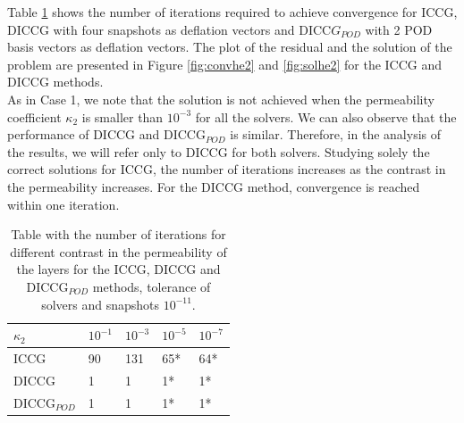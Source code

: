 \documentclass{ecmorXV}
\begin{document}
Table \ref{table:he2} shows the number of iterations required to achieve convergence 
for ICCG, DICCG with four snapshots as deflation vectors and DICC$G_{POD}$ with 2 POD basis vectors
as deflation vectors. The plot of the residual and the solution of the problem are presented in 
Figure \ref{fig:convhe2} and \ref{fig:solhe2} for the ICCG and DICCG methods.\\
As in Case 1, we note that the solution is not achieved when the permeability coefficient $\kappa_2$
is smaller than $10^{-3}$ for all the solvers. We can also observe that the performance of DICCG
and DICCG$_{POD}$ is similar. Therefore, in the analysis of the results, we will refer only to DICCG for
both solvers.
Studying solely the correct solutions for ICCG, the number of iterations 
increases as the contrast in the permeability increases. For the DICCG method, convergence is reached 
within one iteration.\\
\begin{table}[!ht]
\centering
\begin{tabular}{ |p{2.5cm}|p{1.5cm}|p{1.5cm}|p{1.5cm}| p{1.5cm}|} 
\hline
$\kappa_2$& $10^{-1}$ &$10^{-3}$  & $10^{-5}$ &$10^{-7}$\\
 \hline
  ICCG  & 90& 131&65*&64*\\ 
  DICCG  & 1 &1& 1*&1*\\ 
  DICCG$_{POD}$ & 1& 1& 1*& 1*\\
 \hline
\end{tabular}
\caption{Table with the number of iterations for different contrast in the permeability of the layers
for the ICCG, DICCG and DICCG$_{POD}$ methods, tolerance of solvers and snapshots $10^{-11}$. }
\label{table:he2}
\end{table}
\end{document}
